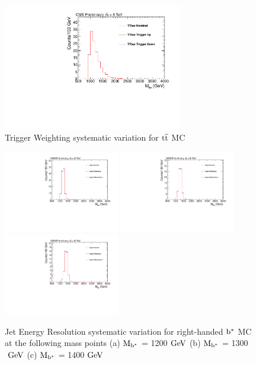 \begin{figure}[htcb]
\begin{center}
\includegraphics[width=0.7\textwidth]{AN-14-049/figs/TTbar_TriggerWeighting}
\caption{Trigger Weighting systematic variation for $\mathrm{t\overline{t}}$ MC}
\label{figs:bsttbartrig}
\end{center}
\end{figure}


\begin{figure}[htcb]
\begin{center}
\includegraphics[width=0.45\textwidth]{AN-14-049/figs/Signal_M1200_PtSmearing}
\includegraphics[width=0.45\textwidth]{AN-14-049/figs/Signal_M1300_PtSmearing}
\includegraphics[width=0.45\textwidth]{AN-14-049/figs/Signal_M1400_PtSmearing}
\caption{
Jet Energy Resolution systematic variation for right-handed $\mathrm{b}^{*}$  MC at the following mass points
(a) $\mathrm{M_{\mathrm{b}^{*}}}$ = 1200$~\mathrm{GeV}$ 
(b) $\mathrm{M_{\mathrm{b}^{*}}}$ = 1300$~\mathrm{GeV}$
(c) $\mathrm{M_{\mathrm{b}^{*}}}$ = 1400$~\mathrm{GeV}$ 
}
\label{figs:bssignalJER}
\end{center}
\end{figure}

